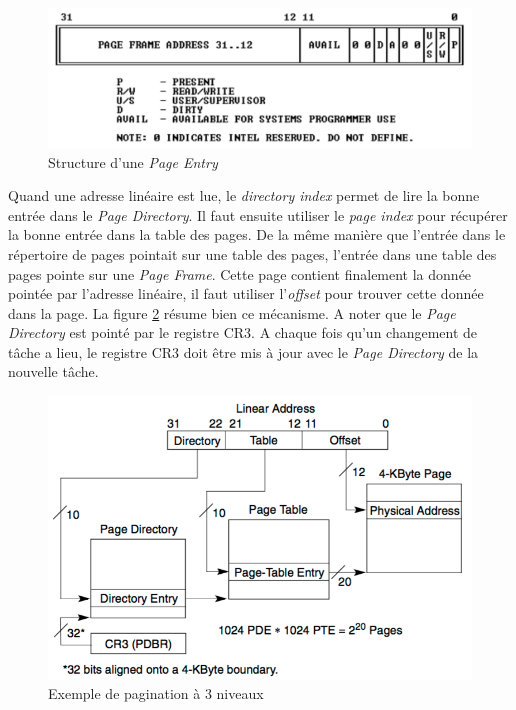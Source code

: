 \begin{figure}[!h]
  \centering
  \includegraphics[scale=0.6]{images/page_entry.png}
  \caption{Structure d'une \textit{Page Entry}}
  \label{page_entry}
\end{figure}

Quand une adresse linéaire est lue, le \textit{directory index} permet
de lire la bonne entrée dans le \textit{Page Directory}. Il faut ensuite utiliser
le \textit{page index} pour récupérer la bonne entrée dans la table des pages.
De la même manière que l'entrée dans le répertoire de pages pointait sur une table
des pages, l'entrée dans une table des pages pointe sur une \textit{Page Frame}.
Cette page contient finalement la donnée pointée par l'adresse linéaire, il faut
utiliser l'\textit{offset} pour trouver cette donnée dans la page. La figure \ref{paging3}
résume bien ce mécanisme.\cite{ref66} A noter que le \textit{Page Directory} est
pointé par le registre CR3. A chaque fois qu'un changement de tâche a lieu, le
registre CR3 doit être mis à jour avec le \textit{Page Directory} de la nouvelle
tâche.\cite{ref15}

\begin{figure}[!h]
  \centering
  \includegraphics[scale=0.85]{images/paging3.png}
  \caption{Exemple de pagination à 3 niveaux}
  \label{paging3}
\end{figure}

